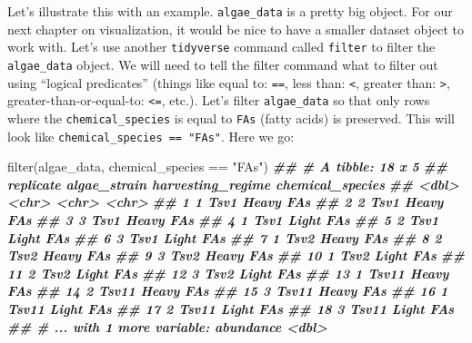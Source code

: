 \documentclass[
]{krantz}
\newenvironment{Shaded}{\begin{snugshade}}{\end{snugshade}}
\newcommand{\DocumentationTok}[1]{\textcolor[rgb]{0.56,0.35,0.01}{\textbf{\textit{#1}}}}
\newcommand{\FunctionTok}[1]{\textcolor[rgb]{0.00,0.00,0.00}{#1}}
\newcommand{\NormalTok}[1]{#1}
\newcommand{\SpecialCharTok}[1]{\textcolor[rgb]{0.00,0.00,0.00}{#1}}
\newcommand{\StringTok}[1]{\textcolor[rgb]{0.31,0.60,0.02}{#1}}
\begin{document}
Let's illustrate this with an example. \texttt{algae\_data} is a pretty big object. For our next chapter on visualization, it would be nice to have a smaller dataset object to work with. Let's use another \texttt{tidyverse} command called \texttt{filter} to filter the \texttt{algae\_data} object. We will need to tell the filter command what to filter out using ``logical predicates'' (things like equal to: \texttt{==}, less than: \texttt{\textless{}}, greater than: \texttt{\textgreater{}}, greater-than-or-equal-to: \texttt{\textless{}=}, etc.). Let's filter \texttt{algae\_data} so that only rows where the \texttt{chemical\_species} is equal to \texttt{FAs} (fatty acids) is preserved. This will look like \texttt{chemical\_species\ ==\ "FAs"}. Here we go:

\begin{Shaded}
\begin{Highlighting}[]
\FunctionTok{filter}\NormalTok{(algae\_data, chemical\_species }\SpecialCharTok{==} \StringTok{"FAs"}\NormalTok{)}
\DocumentationTok{\#\# \# A tibble: 18 x 5}
\DocumentationTok{\#\#    replicate algae\_strain harvesting\_regime chemical\_species}
\DocumentationTok{\#\#        \textless{}dbl\textgreater{} \textless{}chr\textgreater{}        \textless{}chr\textgreater{}             \textless{}chr\textgreater{}           }
\DocumentationTok{\#\#  1         1 Tsv1         Heavy             FAs             }
\DocumentationTok{\#\#  2         2 Tsv1         Heavy             FAs             }
\DocumentationTok{\#\#  3         3 Tsv1         Heavy             FAs             }
\DocumentationTok{\#\#  4         1 Tsv1         Light             FAs             }
\DocumentationTok{\#\#  5         2 Tsv1         Light             FAs             }
\DocumentationTok{\#\#  6         3 Tsv1         Light             FAs             }
\DocumentationTok{\#\#  7         1 Tsv2         Heavy             FAs             }
\DocumentationTok{\#\#  8         2 Tsv2         Heavy             FAs             }
\DocumentationTok{\#\#  9         3 Tsv2         Heavy             FAs             }
\DocumentationTok{\#\# 10         1 Tsv2         Light             FAs             }
\DocumentationTok{\#\# 11         2 Tsv2         Light             FAs             }
\DocumentationTok{\#\# 12         3 Tsv2         Light             FAs             }
\DocumentationTok{\#\# 13         1 Tsv11        Heavy             FAs             }
\DocumentationTok{\#\# 14         2 Tsv11        Heavy             FAs             }
\DocumentationTok{\#\# 15         3 Tsv11        Heavy             FAs             }
\DocumentationTok{\#\# 16         1 Tsv11        Light             FAs             }
\DocumentationTok{\#\# 17         2 Tsv11        Light             FAs             }
\DocumentationTok{\#\# 18         3 Tsv11        Light             FAs             }
\DocumentationTok{\#\# \# ... with 1 more variable: abundance \textless{}dbl\textgreater{}}
\end{Highlighting}
\end{Shaded}
\end{document}
